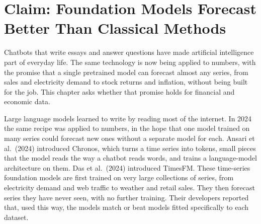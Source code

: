 \makeatletter
{}
\makeatother

\makeatletter
\makeatother

\chapter{Claim: Foundation Models Forecast Better Than Classical Methods}
\label{ch:20}

Chatbots that write essays and answer questions have made artificial intelligence part of everyday life. The same technology is now being applied to numbers, with the promise that a single pretrained model can forecast almost any series, from sales and electricity demand to stock returns and inflation, without being built for the job. This chapter asks whether that promise holds for financial and economic data.

Large language models learned to write by reading most of the internet. In 2024 the same recipe was applied to numbers, in the hope that one model trained on many series could forecast new ones without a separate model for each. Ansari et al.\ (2024) introduced Chronos, which turns a time series into tokens, small pieces that the model reads the way a chatbot reads words, and trains a language-model architecture on them. Das et al.\ (2024) introduced TimesFM. These time-series foundation models are first trained on very large collections of series, from electricity demand and web traffic to weather and retail sales. They then forecast series they have never seen, with no further training. Their developers reported that, used this way, the models match or beat models fitted specifically to each dataset.

